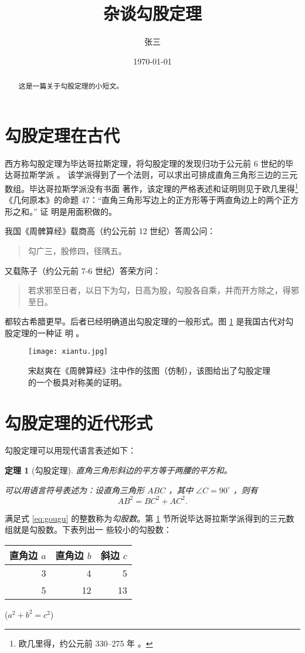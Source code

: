 \documentclass[UTF8]{ctexart}
\title{\heiti 杂谈勾股定理}
\author{\kaishu 张三}
\date{\today}
\newtheorem{thm}{定理}
\newenvironment{myquote}
    {\begin{quote}\kaishu\zihao{-5}}
    {\end{quote}}
\newcommand\degree{^\circ}
\begin{document}
\maketitle
\begin{abstract}
    这是一篇关于勾股定理的小短文。
\end{abstract}
\tableofcontents
\section{勾股定理在古代}\label{sec1}
西方称勾股定理为毕达哥拉斯定理，将勾股定理的发现归功于公元前 6 世纪的毕达哥拉斯学派 \cite{Kline}。
该学派得到了一个法则，可以求出可排成直角三角形三边的三元数组。毕达哥拉斯学派没有书面
著作，该定理的严格表述和证明则见于欧几里得\footnote{欧几里得，约公元前 330--275 年
。}《几何原本》的命题 47：“直角三角形写边上的正方形等于两直角边上的两个正方形之和。”
证 明是用面积做的。

我国《周髀算经》载商高（约公元前 12 世纪）答周公问：
\begin{myquote}
    勾广三，股修四，径隅五。
\end{myquote}
又载陈子（约公元前 7-6 世纪）答荣方问：
\begin{myquote}
    若求邪至日者，以日下为勾，日高为股，勾股各自乘，并而开方除之，得邪至日。
\end{myquote}
都较古希腊更早。后者已经明确道出勾股定理的一般形式。图 \ref{fig:xiantu} 是我国古代对勾股定理的一种证
明 \cite{quanjing}。

\begin{figure}[ht]
    \centering
    \texttt{[image: xiantu.jpg]}
    \caption{宋赵爽在《周髀算经》注中作的弦图（仿制），该图给出了勾股定理的一个极具对称美的证明。}
    \label{fig:xiantu}
\end{figure}

\section{勾股定理的近代形式}
勾股定理可以用现代语言表述如下：

\begin{thm}[勾股定理]
直角三角形斜边的平方等于两腰的平方和。

可以用语言符号表述为：设直角三角形 $ABC$ ，其中 $\angle C=90\degree$ ，则有
\begin{equation}\label{eq:gougu}
    AB^2=BC^2+AC^2.
\end{equation}
\end{thm}

满足式 \eqref{eq:gougu} 的整数称为\emph{勾股数}。第 \ref{sec1} 节所说毕达哥拉斯学派得到的三元数组就是勾股数。下表列出一
些较小的勾股数：
\begin{table}[H]
    \begin{tabular}{|rrr|}
        \hline
        直角边 $a$ & 直角边 $b$ & 斜边 $c$ \\
        \hline
                3 &          4 &        5 \\
                5 &         12 &       13 \\
        \hline
    \end{tabular}%
    \qquad
    ($a^2 + b^2 = c^2$)
\end{table}

\nocite{Shiye}

\end{document}
